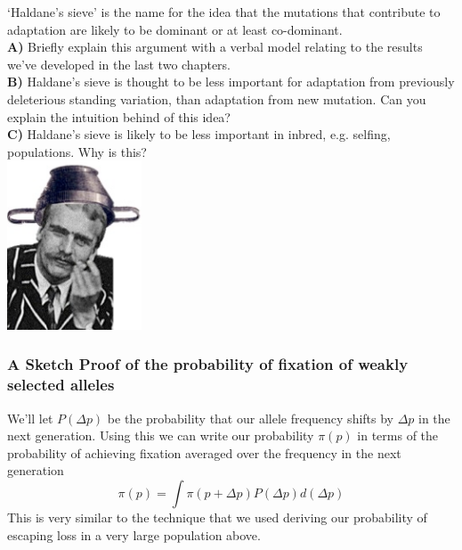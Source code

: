 \begin{tcolorbox} 
\begin{question}
`Haldane's sieve’ is the name for the idea that the mutations that contribute to adaptation are likely to be dominant or at least co-dominant. \\
{\bf A)} Briefly explain this argument with a verbal model relating to the
results we’ve developed in the last two chapters. \\
{\bf B)} Haldane’s sieve is thought to be less important for adaptation from previously deleterious standing variation, than adaptation from new mutation. Can you explain the intuition behind of this idea?\\
{\bf C)} Haldane’s sieve is likely to be less important in inbred,
e.g. selfing, populations. Why is this? \\
\includegraphics[width=0.3\textwidth]{figures/haldanes_sieve.png}

\end{question}
\end{tcolorbox}



\subsubsection{A Sketch Proof of the probability of fixation of
weakly selected alleles} \label{Section:fixation_weakly_sel}

We'll let $P(\Delta p)$ be the probability that our allele frequency
shifts by $\Delta p$ in the next generation. Using this we can write our probability $\pi(p)$ in terms of the probability of
achieving fixation averaged over the frequency in the next generation
\begin{equation}
\pi(p)  = \int \pi(p+\Delta p) P(\Delta p) d(\Delta p) \label{eqn:prob_fix_diff_step1}
\end{equation}
This is very similar to the technique that we used deriving our
probability of escaping loss in a very large population above. \\

